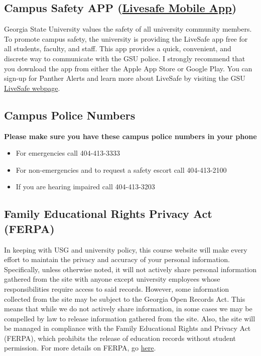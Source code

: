 \documentclass[a4paper, 12pt]{article}
\begin{document}
\subsection{Campus Safety APP (\href{https://safety.gsu.edu/livesafe/}{Livesafe Mobile App})}
Georgia State University values the safety of all university community members.  To promote campus safety, the university is providing the LiveSafe app free for all students, faculty, and staff.  This app provides a quick, convenient, and discrete way to communicate with the GSU police.  I strongly recommend that you download the app from either the Apple App Store or Google Play.  You can sign-up for Panther Alerts and learn more about LiveSafe by visiting the GSU \href{https://safety.gsu.edu/livesafe/}{LiveSafe webpage}.

\subsection{Campus Police Numbers}
\textbf{Please make sure you have these campus police numbers in your phone}
\begin{itemize}
  \item For emergencies call 404-413-3333
  \item For non-emergencies and to request a safety escort call 404-413-2100 
  \item If you are hearing impaired call 404-413-3203
\end{itemize}

\subsection{Family Educational Rights Privacy Act (FERPA)}
In keeping with USG and university policy, this course website will make every effort to maintain the privacy and accuracy of your personal information. Specifically, unless otherwise noted, it will not actively share personal information gathered from the site with anyone except university employees whose responsibilities require access to said records. However, some information collected from the site may be subject to the Georgia Open Records Act. This means that while we do not actively share information, in some cases we may be compelled by law to release information gathered from the site. Also, the site will be managed in compliance with the Family Educational Rights and Privacy Act (FERPA), which prohibits the release of education records without student permission.  For more details on FERPA, go \href{https://registrar.gsu.edu/academic-records/records-access/#ferpa}{here}.
\end{document}

